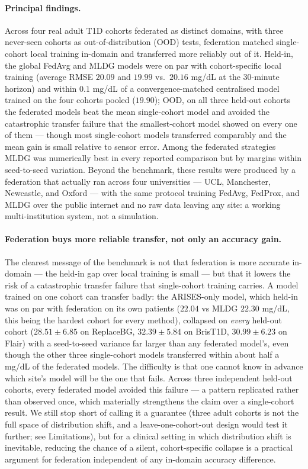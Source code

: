 \documentclass[10pt,letterpaper]{article}
\begin{document}
\paragraph{Principal findings.} Across four real adult T1D cohorts federated as
distinct domains, with three never-seen cohorts as out-of-distribution (OOD)
tests, federation matched single-cohort local training in-domain and transferred
more reliably out of it. Held-in, the global FedAvg and MLDG models were on par
with cohort-specific local training (average RMSE $20.09$ and $19.99$ vs.\
$20.16$ mg/dL at the 30-minute horizon) and within $0.1$ mg/dL of a
convergence-matched centralised model trained on the four cohorts pooled
($19.90$); OOD, on all three held-out cohorts the
federated models beat the mean single-cohort model and avoided the catastrophic
transfer failure that the smallest-cohort model showed on every one of them ---
though most single-cohort models transferred comparably and the mean gain is
small relative to sensor error. Among the federated strategies MLDG was
numerically best in every reported comparison but by margins within seed-to-seed
variation. Beyond the benchmark, these results were produced by a federation that
actually ran across four universities --- UCL, Manchester, Newcastle, and Oxford
--- with the same protocol training FedAvg, FedProx, and MLDG over the public
internet and no raw data leaving any site: a working multi-institution system,
not a simulation.

\paragraph{Federation buys more reliable transfer, not only an accuracy gain.}
The clearest message of the benchmark is not that federation is more accurate
in-domain --- the held-in gap over local training is small --- but that it
lowers the risk of a catastrophic transfer failure that single-cohort training
carries. A model trained on one cohort can transfer badly: the ARISES-only
model, which held-in was on par with federation on its own patients ($22.04$ vs
MLDG $22.30$ mg/dL, this being the hardest cohort for every method), collapsed on
\emph{every} held-out cohort ($28.51 \pm 6.85$ on ReplaceBG, $32.39 \pm 5.84$ on
BrisT1D, $30.99 \pm 6.23$ on Flair) with a seed-to-seed variance far larger than
any federated model's, even though the other three single-cohort models
transferred within about half a mg/dL of the federated models. The difficulty is
that one cannot know in advance which site's model will be the one that fails.
Across three independent held-out cohorts, every federated model avoided this
failure --- a pattern replicated rather than observed once, which materially
strengthens the claim over a single-cohort result. We still stop short of calling
it a guarantee (three adult cohorts is not the full space of distribution shift,
and a leave-one-cohort-out design would test it further; see Limitations), but
for a clinical setting in which distribution shift is inevitable, reducing the
chance of a silent, cohort-specific collapse is a practical argument for
federation independent of any in-domain accuracy difference.
\end{document}
